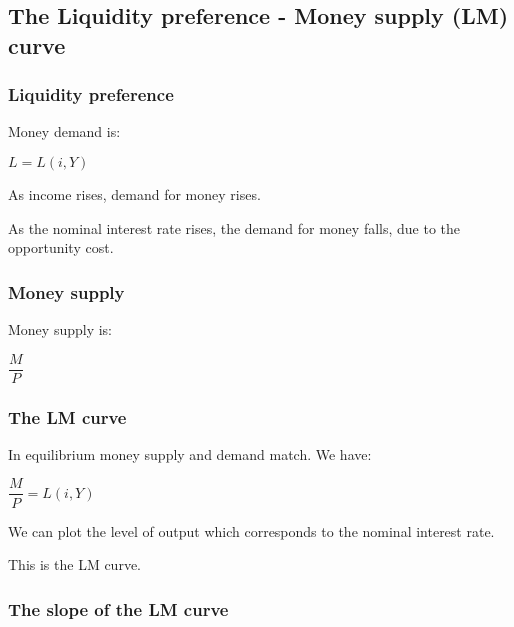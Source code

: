 
\subsection{The Liquidity preference - Money supply (LM) curve}

\subsubsection{Liquidity preference}

Money demand is:

\(L=L(i, Y)\)

As income rises, demand for money rises.

As the nominal interest rate rises, the demand for money falls, due to the opportunity cost.

\subsubsection{Money supply}

Money supply is:

\(\dfrac{M}{P}\)

\subsubsection{The LM curve}

In equilibrium money supply and demand match. We have:

\(\dfrac{M}{P}=L(i,Y)\)

We can plot the level of output which corresponds to the nominal interest rate.

This is the LM curve.

\subsubsection{The slope of the LM curve}


